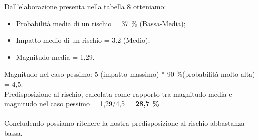 	Dall'elaborazione presenta nella tabella 8 otteniamo:
	\begin{itemize}
	    \item Probabilità media di un rischio = 37 \% (Bassa-Media);
	    \item Impatto medio di un rischio = 3.2 (Medio);
	    \item  Magnitudo media = 1,29.
	\end{itemize}
	Magnitudo nel caso pessimo: 5 (impatto massimo) * 90 \%(probabilità molto alta) = 4,5.\\
	Predisposizione al rischio, calcolata come rapporto tra magnitudo media e magnitudo nel caso pessimo = 1,29/4,5 = \textbf{ 28,7 \% }\\ \\
	Concludendo possiamo ritenere la nostra predisposizione al rischio abbastanza bassa.
